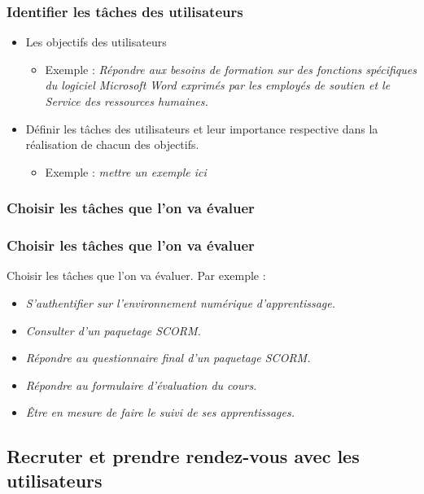 	\subsubsection{Identifier les tâches des utilisateurs} 
		\begin{frame}[allowframebreaks]
			\begin {itemize}
			\frametitle{Identifier les tâches des utilisateurs}
				      \item Les objectifs des utilisateurs
						\begin {itemize}
						\item Exemple : \textit{Répondre aux besoins de formation sur des fonctions spécifiques du logiciel Microsoft Word exprimés par les employés de soutien et le Service des ressources humaines.}
						\end{itemize}
					\item Définir les tâches des utilisateurs et leur importance respective dans la réalisation de chacun des objectifs.
						\begin {itemize}
						\item Exemple : \textit{mettre un exemple ici}
						\end{itemize}
					
					\end{itemize}
		\end{frame}    
	\subsubsection{Choisir les tâches que l’on va évaluer} 
		\begin{frame}[allowframebreaks]
		\frametitle{Choisir les tâches que l’on va évaluer}
			Choisir les tâches que l’on va évaluer. Par exemple :
			\begin {itemize}
				     		\item \textit{S’authentifier sur l’environnement numérique d’apprentissage.}
						\item \textit{Consulter d’un paquetage SCORM.}
						\item \textit{Répondre au questionnaire final d’un paquetage SCORM.}
						\item \textit{Répondre au formulaire d’évaluation du cours.}
						\item \textit{Être en mesure de faire le suivi de ses apprentissages.}
			\end{itemize}
		\end{frame}  
		
	\subsection{Recruter et prendre rendez-vous avec les utilisateurs} 
		
